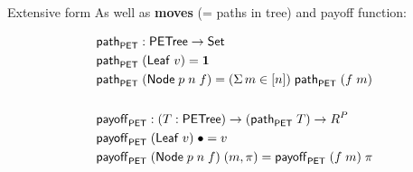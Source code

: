\begin{frame}{Extensive form}
	As well as \textbf{\textcolor{coloragents}{moves}} (= paths in tree) and payoff function:

	\begin{minipage}[c]{\textwidth}
		\begin{minipage}[c]{.47\textwidth}

		\end{minipage}
		\begin{minipage}[c]{.47\textwidth}
			\begin{align*}
				& \mathsf{path}_{\mathsf{PET}} : \mathsf{PETree} \to \mathsf{Set} \\
				& \mathsf{path}_{\mathsf{PET}} \; (\mathsf{Leaf} \; v) = \mathbf{1} \\
				& \mathsf{path}_{\mathsf{PET}} \; (\mathsf{Node} \; p \; n \; f) = (\Sigma\,{m \in [n]}) \; \mathsf{path}_{\mathsf{PET}}\; (f\; m)\\
				&\\
				& \mathsf{payoff}_{\mathsf{PET}} : (T : \mathsf{PETree}) \to (\mathsf{path}_{\mathsf{PET}}\;T) \to R^P\\
				& \mathsf{payoff}_{\mathsf{PET}} \; (\mathsf{Leaf} \; v) \; \bullet = v\\
				& \mathsf{payoff}_{\mathsf{PET}} \; (\mathsf{Node} \; p \; n \; f) \; (m, \pi) = \mathsf{payoff}_{\mathsf{PET}}\; (f\; m) \; \pi
			\end{align*}
		\end{minipage}
	\end{minipage}
\end{frame}






